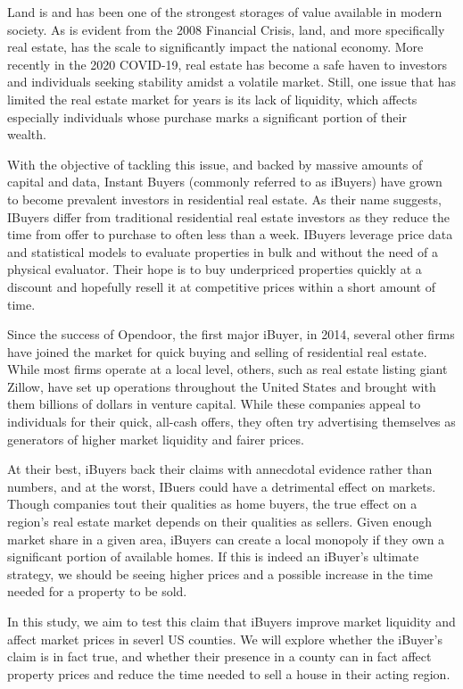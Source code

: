 Land is and has been one of the strongest storages of value available in modern society. As is evident from the 2008 Financial Crisis, land, and more specifically real estate, has the scale to significantly impact the national economy. More recently in the 2020 COVID-19, real estate has become a safe haven to investors and individuals seeking stability amidst a volatile market. Still, one issue that has limited the real estate market for years is its lack of liquidity, which affects especially individuals whose purchase marks a significant portion of their wealth.  

With the objective of tackling this issue, and backed by massive amounts of capital and data, Instant Buyers (commonly referred to as iBuyers) have grown to become prevalent investors in residential real estate. As their name suggests, IBuyers differ from traditional residential real estate investors as they reduce the time from offer to purchase to often less than a week. IBuyers leverage price data and statistical models to evaluate properties in bulk and without the need of a physical evaluator. Their hope is to buy underpriced properties quickly at a discount and hopefully resell it at competitive prices within a short amount of time. 

Since the success of Opendoor, the first major iBuyer, in 2014, several other firms have joined the market for quick buying and selling of residential real estate. While most firms operate at a local level, others, such as real estate listing giant Zillow, have set up operations throughout the United States and brought with them billions of dollars in venture capital. While these companies appeal to individuals for their quick, all-cash offers, they often try advertising themselves as generators of higher market liquidity and fairer prices.  

At their best, iBuyers back their claims with annecdotal evidence rather than numbers, and at the worst, IBuers could have a detrimental effect on markets. Though companies tout their qualities as home buyers, the true effect on a region's real estate market depends on their qualities as sellers. Given enough market share in a given area, iBuyers can create a local monopoly if they own a significant portion of available homes. If this is indeed an iBuyer's ultimate strategy, we should be seeing higher prices and a possible increase in the time needed for a property to be sold.

In this study, we aim to test this claim that iBuyers improve market liquidity and affect market prices in severl US counties. We will explore whether the iBuyer's claim is in fact true, and whether their presence in a county can in fact affect property prices and reduce the time needed to sell a house in their acting region. 

